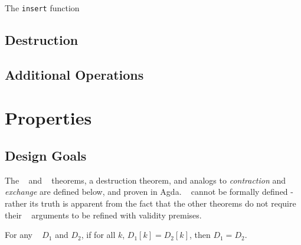 The \verb+insert+ function 


\subsection{Destruction}


\subsection{Additional Operations}




\section{Properties}
\label{sec:DD:props}

\subsection{Design Goals}

The \SemInj~ and \EqDec~ theorems, a destruction theorem, and analogs to \emph{contraction} and
\emph{exchange} are defined below, and proven in Agda. \SemTot~ cannot be formally defined - rather
its truth is apparent from the fact that the other theorems do not require their \dd~ arguments to
be refined with validity premises.

\begin{proposition}[\SemTot]

\breakAndIndent
%

\end{proposition}

\begin{theorem}[\SemInj]
\label{thm:SemInj}

\breakAndIndent
%
For any \dds~ $D_1$ and $D_2$,
%
if for all $k$, $D_1[k] = D_2[k]$,
%
then $D_1 = D_2$.

\end{theorem}

